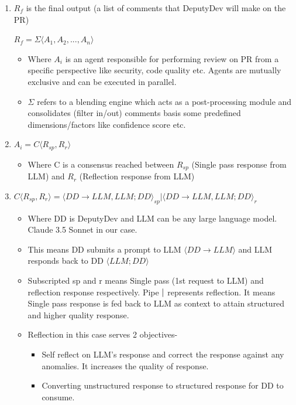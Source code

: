 \begin{enumerate}
    \item $R_f$ is the final output (a list of comments that DeputyDev will make on the PR)
    
    $R_f = \Sigma\langle A_1, A_2, ..., A_n\rangle$
    
    \begin{itemize}
        \item Where $A_i$ is an agent responsible for performing review on PR from a specific perspective like security, code quality etc. Agents are mutually exclusive and can be executed in parallel.
        \item $\Sigma$ refers to a blending engine which acts as a post-processing module and consolidates (filter in/out) comments basis some predefined dimensions/factors like confidence score etc.
    \end{itemize}
    
    \item $A_i = C\langle R_{sp}, R_r\rangle$
    \begin{itemize}
        \item Where C is a consensus reached between $R_{sp}$ (Single pass response from LLM) and $R_r$ (Reflection response from LLM)
    \end{itemize}
    
    \item $C\langle R_{sp}, R_r\rangle = \langle DD \rightarrow LLM, LLM ; DD\rangle_{sp} | \langle DD \rightarrow LLM, LLM ; DD\rangle_r$
    \begin{itemize}
        \item Where DD is DeputyDev and LLM can be any large language model. Claude 3.5 Sonnet in our case.
        \item This means DD submits a prompt to LLM $\langle DD \rightarrow LLM\rangle$ and LLM responds back to DD $\langle LLM ; DD\rangle$
        \item Subscripted sp and r means Single pass (1st request to LLM) and reflection response respectively. Pipe $ \mathbin{\vert} $ represents reflection. It means Single pass response is fed back to LLM as context to attain structured and higher quality response.
        \item Reflection in this case serves 2 objectives-
        \begin{itemize}
            \item Self reflect on LLM's response and correct the response against any anomalies. It increases the quality of response.
            \item Converting unstructured response to structured response for DD to consume.
        \end{itemize}
    \end{itemize}
\end{enumerate}